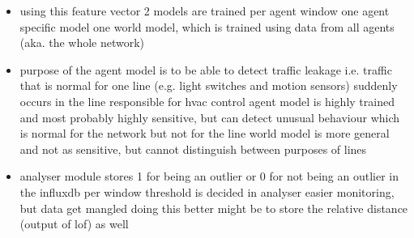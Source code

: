 \begin{itemize}
	\item using this feature vector 2 models are trained per agent window
		\subitem one agent specific model
		\subitem one world model, which is trained using data from all agents (aka. the whole network)
	\item purpose of the agent model is to be able to detect traffic leakage
		\subitem i.e. traffic that is normal for one line (e.g. light switches and motion sensors) suddenly occurs in the line responsible for \gls{hvac} control
		\subitem agent model is highly trained and most probably highly sensitive, but can detect unusual behaviour which is normal for the network but not for the line
		\subitem world model is more general and not as sensitive, but cannot distinguish between purposes of lines
	\item analyser module stores 1 for being an outlier or 0 for not being an outlier in the \gls{influxdb} per window
		\subitem threshold is decided in analyser
		\subitem easier monitoring, but data get mangled doing this
		\subitem better might be to store the relative distance (output of \gls{lof}) as well
	
\end{itemize}

